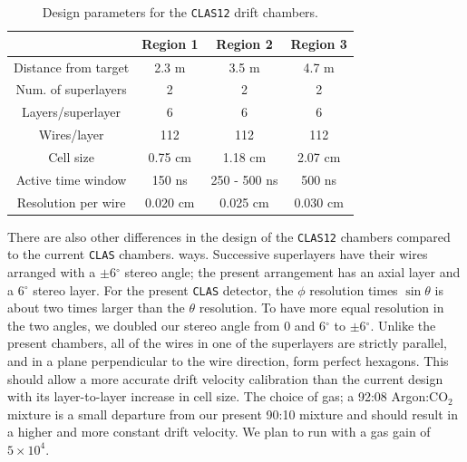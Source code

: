 \begin{table}[ht]
\begin{center}
\begin{tabular} {||c|c|c|c||} \hline \hline
                     &{\bf Region 1}&{\bf Region 2}&{\bf Region 3}\\ \hline
Distance from target & 2.3 m    & 3.5 m        & 4.7 m    \\ \hline
Num. of superlayers  & 2        & 2            & 2        \\ \hline
Layers/superlayer    & 6        & 6            & 6        \\ \hline
Wires/layer          & 112      & 112          & 112      \\ \hline
Cell size            & 0.75 cm  & 1.18 cm      & 2.07 cm  \\ \hline
Active time window   & 150 ns   & 250 - 500 ns & 500 ns   \\ \hline
Resolution per wire  & 0.020 cm & 0.025 cm     & 0.030 cm \\ \hline
\end{tabular}
\caption{\small{Design parameters for the {\tt CLAS12} drift chambers.}}
\label{fwd-dc-design-parms}
\end{center}
\end{table}

There are also other differences in the design of the {\tt CLAS12} chambers 
compared to the current {\tt CLAS} chambers.  ways.  Successive superlayers 
have their wires arranged with a $\pm$6$^\circ$ stereo angle; the present 
arrangement has an axial layer and a 6$^\circ$ stereo layer.  For the present 
{\tt CLAS} detector, the $\phi$ resolution times $\sin \theta$ is about two 
times larger than the $\theta$ resolution.  To have more equal resolution in 
the two angles, we doubled our stereo angle from 0 and 6$^\circ$ to 
$\pm$6$^\circ$.  Unlike the present chambers, all of the wires in one of the 
superlayers are strictly parallel, and in a plane perpendicular to the wire 
direction, form perfect hexagons.  This should allow a more accurate drift 
velocity calibration than the current design with its layer-to-layer increase 
in cell size.  The choice of gas; a 92:08 Argon:CO$_2$ mixture is a small 
departure from our present 90:10 mixture and should result in a higher and 
more constant drift velocity.  We plan to run with a gas gain of 
$5 \times 10^4$.

